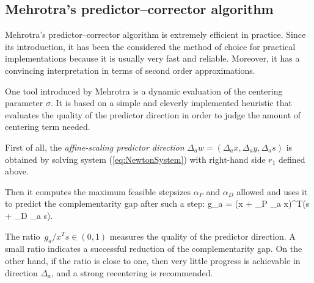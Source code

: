 %
%
\subsection{Mehrotra's predictor--corrector algorithm}

Mehrotra's predictor--corrector algorithm \cite{Mehrotra92,LustigMarstenShanno}
is extremely efficient in practice. Since its introduction, it has 
been the considered the method of choice for practical implementations 
because it is usually very fast and reliable. Moreover, it has a 
convincing interpretation in terms of second order approximations.



One tool introduced by Mehrotra \cite{Mehrotra92} is a dynamic evaluation 
of the centering parameter $\sigma$. It is based on a simple and cleverly 
implemented heuristic that evaluates the quality of the predictor direction
in order to judge the amount of centering term needed.

First of all, the {\em affine-scaling predictor direction} 
$\Delta_a w = (\Delta_a x, \Delta_a y, \Delta_a s)$ is obtained by solving 
system (\ref{eq:NewtonSystem}) with right-hand side $r_1$ defined above.

Then it computes the maximum feasible stepsizes $\alpha_P$ and $\alpha_D$ 
allowed and uses it to predict the complementarity gap after such a step:
\be \label{eq:PredictedGap}
  g_a = (x + \alpha_P \Delta_a x)^T(s + \alpha_D \Delta_a s).
\ee

The ratio $\,g_a / x^{T}s \in (0,1)$ measures the quality of the 
predictor direction.
A small ratio indicates a successful reduction of the complementarity 
gap. On the other hand, if the ratio is close to one, then very little 
progress is achievable in direction $\Delta_a$, and a strong recentering 
is recommended.

